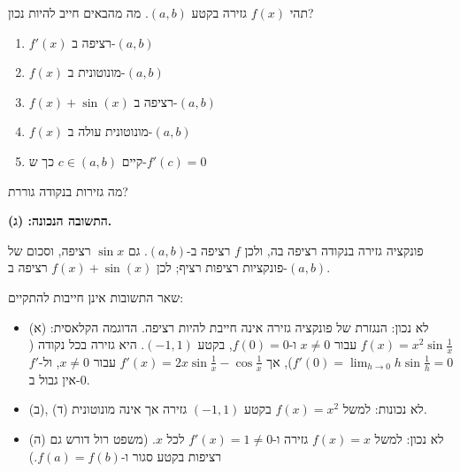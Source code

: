 
\begin{question}
תהי $f(x)$ גזירה בקטע $(a,b)$. מה מהבאים חייב להיות נכון?
\begin{enumerate}
  \item[(א)] $f'(x)$ רציפה ב-$(a,b)$
  \item[(ב)] $f(x)$ מונוטונית ב-$(a,b)$
  \item[(ג)] $f(x)+\sin(x)$ רציפה ב-$(a,b)$
  \item[(ד)] $f(x)$ מונוטונית עולה ב-$(a,b)$
  \item[(ה)] קיים $c\in(a,b)$ כך ש-$f'(c)=0$
\end{enumerate}
\end{question}

\begin{hint}
מה גזירות בנקודה גוררת?
\end{hint}

\begin{solution}
\textbf{התשובה הנכונה: (ג).}

פונקציה גזירה בנקודה רציפה בה, ולכן $f$ רציפה ב-$(a,b)$. גם $\sin x$ רציפה, וסכום של פונקציות רציפות רציף; לכן $f(x)+\sin(x)$ רציפה ב-$(a,b)$.

שאר התשובות אינן חייבות להתקיים:
\begin{itemize}
  \item (א) לא נכון: הנגזרת של פונקציה גזירה אינה חייבת להיות רציפה. הדוגמה הקלאסית: $f(x)=x^2\sin\frac1x$ עבור $x\neq0$ ו-$f(0)=0$, בקטע $(-1,1)$. היא גזירה בכל נקודה ($f'(0)=\lim_{h\to0}h\sin\frac1h=0$), אך $f'(x)=2x\sin\frac1x-\cos\frac1x$ עבור $x\ne0$, ול-$f'$ אין גבול ב-$0$.
  \item (ב), (ד) לא נכונות: למשל $f(x)=x^2$ בקטע $(-1,1)$ גזירה אך אינה מונוטונית.
  \item (ה) לא נכון: למשל $f(x)=x$ גזירה ו-$f'(x)=1\ne0$ לכל $x$. (משפט רול דורש גם רציפות בקטע סגור ו-$f(a)=f(b)$.)
\end{itemize}
\end{solution}
